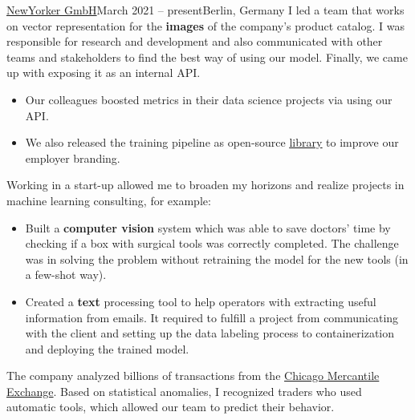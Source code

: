 
{\href{https://www.newyorker.de/}{NewYorker GmbH}}{March 2021 -- present}{Berlin, Germany}
I led a team that works on vector representation for the \textbf{images} of the company's product catalog.
I was responsible for research and development and also
communicated with other teams and stakeholders to find the best way of using our model.
Finally, we came up with exposing it as an internal API. 
\begin{itemize}
\item Our colleagues boosted metrics in their data science projects via using our API. 
\item We also released the training pipeline as open-source \href{https://github.com/OML-Team/open-metric-learning}{\underline{library}} to improve our employer branding. 
\end{itemize}

\divider

Working in a start-up allowed me to broaden my horizons and realize projects in machine learning consulting, for example:
\begin{itemize}
\item Built a \textbf{computer vision} system which was able to save doctors' time by checking if a box with surgical tools was correctly completed. The challenge was in solving the problem without retraining the model for the new tools (in a few-shot way).
\item Created a \textbf{text} processing tool to help operators with extracting useful information from emails. It required to fulfill a project from communicating with the client and setting up the data labeling process to containerization and deploying the trained model.
\end{itemize}

\divider

The company analyzed billions of transactions from the \href{https://en.wikipedia.org/wiki/Chicago_Mercantile_Exchange}
{Chicago Mercantile Exchange}.
Based on statistical anomalies, I recognized traders who used automatic tools, which allowed our team to predict their behavior.
\smallskip
\smallskip
